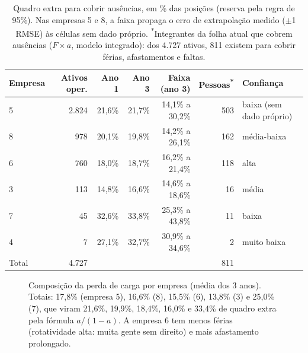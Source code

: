 \documentclass[11pt,a4paper]{article}
\begin{document}
\begin{table}[h]
\centering\small
\begin{tabular}{lrrrrrl}
\toprule
Empresa & Ativos oper. & Ano 1 & Ano 3 & Faixa (ano 3) & Pessoas\textsuperscript{*} & Confiança \\
\midrule
5 & 2.824 & 21,6\% & 21,7\% & 14,1\% a 30,2\% & 503 & baixa (sem dado próprio) \\
8 & 978 & 20,1\% & 19,8\% & 14,2\% a 26,1\% & 162 & média-baixa \\
6 & 760 & 18,0\% & 18,7\% & 16,2\% a 21,4\% & 118 & alta \\
3 & 113 & 14,8\% & 16,6\% & 14,6\% a 18,6\% & 16 & média \\
7 & 45 & 32,6\% & 33,8\% & 25,3\% a 43,8\% & 11 & baixa \\
4 & 7 & 27,1\% & 32,7\% & 30,9\% a 34,6\% & 2 & muito baixa \\
\midrule
Total & 4.727 & & & & 811 & \\
\bottomrule
\end{tabular}
\caption{Quadro extra para cobrir ausências, em \% das posições (reserva pela regra de 95\%). Nas empresas 5 e 8, a faixa propaga o erro de extrapolação medido ($\pm$1 RMSE) às células sem dado próprio. \textsuperscript{*}Integrantes da folha atual que cobrem ausências ($F \times a$, modelo integrado): dos 4.727 ativos, 811 existem para cobrir férias, afastamentos e faltas.}
\end{table}

\begin{figure}[htbp]
\centering
{}
\caption{Composição da perda de carga por empresa (média dos 3 anos). Totais: 17,8\% (empresa 5), 16,6\% (8), 15,5\% (6), 13,8\% (3) e 25,0\% (7), que viram 21,6\%, 19,9\%, 18,4\%, 16,0\% e 33,4\% de quadro extra pela fórmula $a/(1-a)$. A empresa 6 tem menos férias (rotatividade alta: muita gente sem direito) e mais afastamento prolongado.}
\end{figure}
\end{document}
